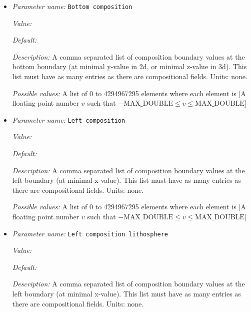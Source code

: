 \begin{itemize}
\item {\it Parameter name:} {\tt Bottom composition}
\label{parameters:Boundary composition model/Box with lithosphere boundary indicators/Bottom composition}


{\it Value:} 


{\it Default:} 


{\it Description:} A comma separated list of composition boundary values at the bottom boundary (at minimal y-value in 2d, or minimal z-value in 3d). This list must have as many entries as there are compositional fields. Units: none.


{\it Possible values:} A list of 0 to 4294967295 elements where each element is [A floating point number $v$ such that $-\text{MAX\_DOUBLE} \leq v \leq \text{MAX\_DOUBLE}$]
\item {\it Parameter name:} {\tt Left composition}
\label{parameters:Boundary composition model/Box with lithosphere boundary indicators/Left composition}


{\it Value:} 


{\it Default:} 


{\it Description:} A comma separated list of composition boundary values at the left boundary (at minimal x-value). This list must have as many entries as there are compositional fields. Units: none.


{\it Possible values:} A list of 0 to 4294967295 elements where each element is [A floating point number $v$ such that $-\text{MAX\_DOUBLE} \leq v \leq \text{MAX\_DOUBLE}$]
\item {\it Parameter name:} {\tt Left composition lithosphere}
\label{parameters:Boundary composition model/Box with lithosphere boundary indicators/Left composition lithosphere}


{\it Value:} 


{\it Default:} 


{\it Description:} A comma separated list of composition boundary values at the left boundary (at minimal x-value). This list must have as many entries as there are compositional fields. Units: none.



\end{itemize}
